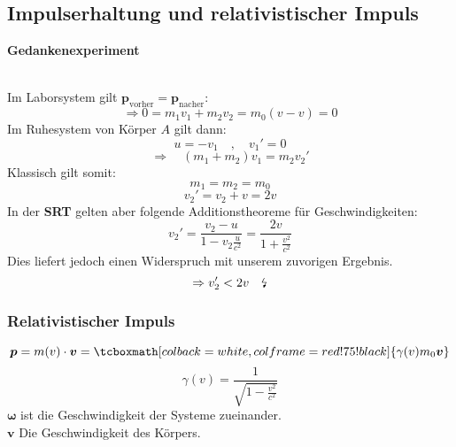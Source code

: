 \documentclass[titlepage,11pt,a4paper,ngerman]{report}
\newcommand{\tx}[1]{\textrm{#1}}
\renewcommand{\vec}[1]{\boldsymbol{#1}}
\newcommand{\rmbox}[1]{\tcboxmath[colback=white,colframe=red!75!black]{#1}}
\begin{document}
\subsection{Impulserhaltung und relativistischer Impuls}
\textbf{Gedankenexperiment}\\[5pt]
\\
Im Laborsystem gilt $ \vec{p}_{\tx{vorher}} = \vec{p}_{\tx{nacher}} $:
\begin{equation*}
\Rightarrow 0 = m_1 v_1 + m_2 v_2 = m_0 (v-v) = 0
\end{equation*}
Im Ruhesystem von Körper $ A $ gilt dann:
\begin{equation*}
u = - v_1 \quad , \quad v_1' = 0
\end{equation*}
\begin{equation*}
\Rightarrow \quad (m_1 + m_2) v_1 = m_2 v_2'
\end{equation*}
Klassisch gilt somit:
\begin{equation*}
m_1 = m_2 = m_0
\end{equation*}
\begin{equation*}
v_2' = v_2 + v = 2v
\end{equation*}
In der \textbf{SRT} gelten aber folgende Additionstheoreme für Geschwindigkeiten:
\begin{equation*}
v_2' = \frac{v_2 - u}{1 - v_2 \frac{u}{c^2}} = \frac{2 v}{1 + \frac{v^2}{c^2}}
\end{equation*}
Dies liefert jedoch einen Widerspruch mit unserem zuvorigen Ergebnis.
\begin{equation*}
\Rightarrow v_2' < 2v \quad \tx{\lightning}
\end{equation*}

\subsubsection{Relativistischer Impuls}
\begin{equation*}
\vec{p} = m(v) \cdot \vec{v} = \rmbox{\gamma(v) m_0 \vec{v}}
\end{equation*}
\begin{equation*}
\gamma(v) = \frac{1}{\sqrt{1 - \frac{v^2}{c^2}}}
\end{equation*}
$ \vec{\omega} $ ist die Geschwindigkeit der Systeme zueinander.\\
$ \vec{v} $ Die Geschwindigkeit des Körpers.
\end{document}
